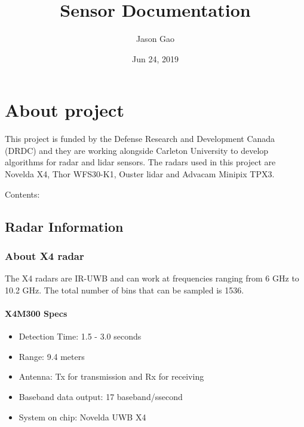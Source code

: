 \documentclass[letterpaper,10pt,english]{sphinxmanual}
\title{Sensor Documentation}
\date{Jun 24, 2019}
\author{Jason Gao}
\begin{document}
\sphinxmaketitle
\pagestyle{plain}
\tableofcontents
\pagestyle{normal}
\label{\detokenize{index::doc}}



\chapter{About project}
\label{\detokenize{index:about-project}}
This project is funded by the Defense Research and Development Canada (DRDC) and they are working alongside Carleton University to develop algorithms for radar and lidar sensors. The radars used in this project are Novelda X4,
Thor WFS30-K1, Ouster lidar and Advacam Minipix TPX3.

Contents:


\section{Radar Information}
\label{\detokenize{radar information:radar-information}}\label{\detokenize{radar information::doc}}

\subsection{About X4 radar}
\label{\detokenize{radar information:about-x4-radar}}
The X4 radars are IR-UWB and can work at frequencies ranging from 6 GHz to 10.2 GHz. The total number of bins that can be sampled is 1536.


\subsubsection{X4M300 Specs}
\label{\detokenize{radar information:x4m300-specs}}\begin{itemize}
\item {} 
Detection Time: 1.5 - 3.0 seconds

\item {} 
Range: 9.4 meters

\item {} 
Antenna: Tx for transmission and Rx for receiving

\item {} 
Baseband data output: 17 baseband/ssecond

\item {} 
System on chip: Novelda UWB X4

\end{itemize}
\end{document}
